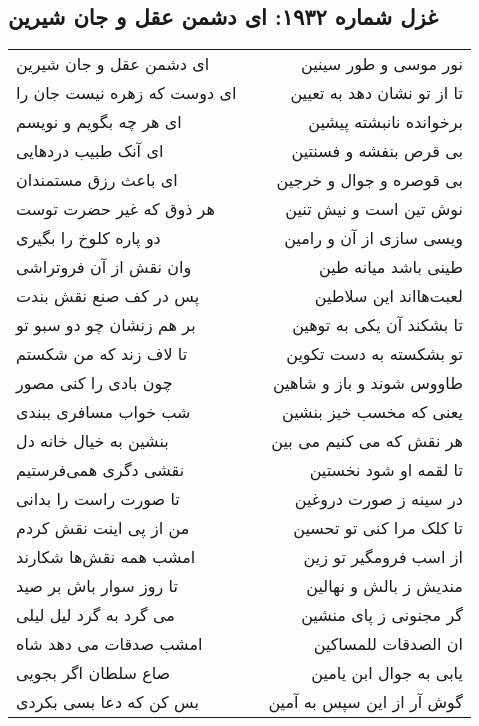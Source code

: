 \begin{center}
\section*{غزل شماره ۱۹۳۲: ای دشمن عقل و جان شیرین}
\label{sec:1932}
\begin{longtable}{l p{0.5cm} r}
ای دشمن عقل و جان شیرین
&&
نور موسی و طور سینین
\\
ای دوست که زهره نیست جان را
&&
تا از تو نشان دهد به تعیین
\\
ای هر چه بگویم و نویسم
&&
برخوانده نانبشته پیشین
\\
ای آنک طبیب دردهایی
&&
بی قرص بنفشه و فسنتین
\\
ای باعث رزق مستمندان
&&
بی قوصره و جوال و خرجین
\\
هر ذوق که غیر حضرت توست
&&
نوش تین است و نیش تنین
\\
دو پاره کلوخ را بگیری
&&
ویسی سازی از آن و رامین
\\
وان نقش از آن فروتراشی
&&
طینی باشد میانه طین
\\
پس در کف صنع نقش بندت
&&
لعبت‌هااند این سلاطین
\\
بر هم زنشان چو دو سبو تو
&&
تا بشکند آن یکی به توهین
\\
تا لاف زند که من شکستم
&&
تو بشکسته به دست تکوین
\\
چون بادی را کنی مصور
&&
طاووس شوند و باز و شاهین
\\
شب خواب مسافری ببندی
&&
یعنی که مخسب خیز بنشین
\\
بنشین به خیال خانه دل
&&
هر نقش که می کنیم می بین
\\
نقشی دگری همی‌فرستیم
&&
تا لقمه او شود نخستین
\\
تا صورت راست را بدانی
&&
در سینه ز صورت دروغین
\\
من از پی اینت نقش کردم
&&
تا کلک مرا کنی تو تحسین
\\
امشب همه نقش‌ها شکارند
&&
از اسب فرومگیر تو زین
\\
تا روز سوار باش بر صید
&&
مندیش ز بالش و نهالین
\\
می گرد به گرد لیل لیلی
&&
گر مجنونی ز پای منشین
\\
امشب صدقات می دهد شاه
&&
ان الصدقات للمساکین
\\
صاع سلطان اگر بجویی
&&
یابی به جوال ابن یامین
\\
بس کن که دعا بسی بکردی
&&
گوش آر از این سپس به آمین
\\
\end{longtable}
\end{center}
